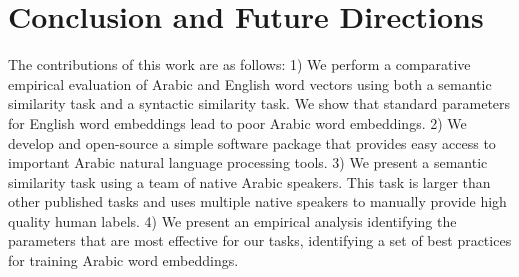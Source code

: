 \section{Conclusion and Future Directions}

The contributions of this work are as follows: 1) We perform a comparative empirical evaluation of Arabic and English word vectors using both a semantic similarity task and a syntactic similarity task. We show that standard parameters for English word embeddings lead to poor Arabic word embeddings. 2) We develop and open-source a simple software package that provides easy access to important Arabic natural language processing tools. 3) We present a semantic similarity task using a team of native Arabic speakers. This task is larger than other published tasks and uses multiple native speakers to manually provide high quality human labels. 4) We present an empirical analysis identifying the parameters that are most effective for our tasks, identifying a set of best practices for training Arabic word embeddings.

\label{sec:conclusions}
